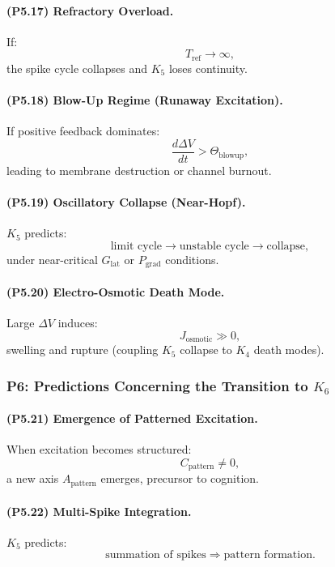 \paragraph{(P5.17) Refractory Overload.}
If:
\[
T_{\mathrm{ref}} \to \infty,
\]
the spike cycle collapses and $K_5$ loses continuity.

\paragraph{(P5.18) Blow-Up Regime (Runaway Excitation).}
If positive feedback dominates:
\[
\frac{d\Delta V}{dt} > \Theta_{\mathrm{blowup}},
\]
leading to membrane destruction or channel burnout.

\paragraph{(P5.19) Oscillatory Collapse (Near-Hopf).}
$K_5$ predicts:
\[
\text{limit cycle} \to \text{unstable cycle} \to \text{collapse},
\]
under near-critical $G_{\mathrm{lat}}$ or $P_{\mathrm{grad}}$ conditions.

\paragraph{(P5.20) Electro-Osmotic Death Mode.}
Large $\Delta V$ induces:
\[
J_{\mathrm{osmotic}} \gg 0,
\]
swelling and rupture (coupling $K_5$ collapse to $K_4$ death modes).

\subsubsection{P6: Predictions Concerning the Transition to \texorpdfstring{$K_6$}{K_6}}

\paragraph{(P5.21) Emergence of Patterned Excitation.}
When excitation becomes structured:
\[
C_{\mathrm{pattern}} \neq 0,
\]
a new axis $A_{\mathrm{pattern}}$ emerges, precursor to cognition.

\paragraph{(P5.22) Multi-Spike Integration.}
$K_5$ predicts:
\[
\text{summation of spikes} \Rightarrow \text{pattern formation}.
\]

